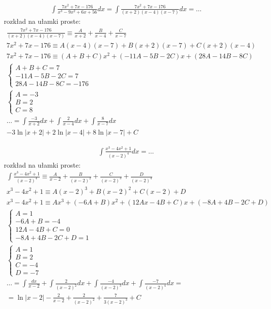 
\begin{gather*}\int \frac{7x^2+7x-176}{x^3-9x^2+6x+56}dx = \int \frac{7x^2+7x-176}{(x+2)(x-4)(x-7)}dx = \ldots\end{gather*}
rozkład na ułamki proste:
\begin{gather*}\frac{7x^2+7x-176}{(x+2)(x-4)(x-7)} \equiv \frac{A}{x+2}+\frac{B}{x-4}+\frac{C}{x-7} \\
7x^2+7x-176 \equiv A(x-4)(x-7)+B(x+2)(x-7)+C(x+2)(x-4) \\
7x^2+7x-176 \equiv (A+B+C)x^2+(-11A-5B-2C)x+(28A-14B-8C) \\
\begin{cases} A+B+C=7 \\ -11A-5B-2C=7 \\ 28A-14B-8C=-176 \end{cases} \\
\begin{cases} A=-3 \\ B=2 \\ C=8 \end{cases} \\
\ldots = \int \frac{-3}{x+2}dx+\int \frac{2}{x-4}dx+\int \frac{8}{x-7}dx \\
 -3\ln|x+2|+2\ln|x-4|+8\ln|x-7|+C\end{gather*}



\begin{gather*}\int \frac{x^3-4x^2+1}{(x-2)^4}dx = \ldots\end{gather*}
rozkład na ułamki proste:
\begin{gather*}\int \frac{x^3-4x^2+1}{(x-2)^4} \equiv \frac{A}{x-2}+\frac{B}{(x-2)^2}+\frac{C}{(x-2)^3}+\frac{D}{(x-2)^4} \\
x^3-4x^2+1 \equiv A(x-2)^3+B(x-2)^2+C(x-2)+D \\
x^3-4x^2+1 \equiv Ax^3+(-6A+B)x^2+(12Ax-4B+C)x+(-8A+4B-2C+D) \\
\begin{cases} A=1 \\ -6A+B=-4 \\ 12A-4B+C=0 \\ -8A+4B-2C+D=1 \end{cases} \\
\begin{cases} A=1 \\ B=2 \\ C=-4 \\ D=-7 \end{cases} \\
\ldots = \int \frac{dx}{x-2} + \int\frac{2}{(x-2)^2}dx + \int\frac{-4}{(x-2)^3}dx + \int\frac{-7}{(x-2)^4}dx = \\
= \ln|x-2|-\frac{2}{x-2}+\frac{2}{(x-2)^2}+\frac{7}{3(x-2)^3}+C\end{gather*}


